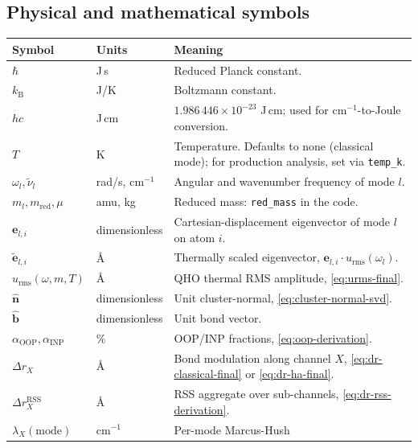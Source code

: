 \documentclass[10pt,a4paper,twoside]{article}
\newcommand{\evec}{\mathbf{e}}
\newcommand{\nhat}{\hat{\mathbf{n}}}
\newcommand{\bhat}{\hat{\mathbf{b}}}
\newcommand{\kB}{k_{\mathrm{B}}}
\newcommand{\urms}{u_{\mathrm{rms}}}
\newcommand{\OOP}{\mathrm{OOP}}
\newcommand{\INP}{\mathrm{INP}}
\newcommand{\fn}[1]{\texttt{#1}}
\newcommand{\cfgkey}[1]{\texttt{#1}}
\begin{document}
\subsection*{Physical and mathematical symbols}

\begin{longtable}{p{} p{} p{}}
\toprule
\textbf{Symbol} & \textbf{Units} & \textbf{Meaning} \\
\midrule
$\hbar$ & J\,s & Reduced Planck constant. \\
$\kB$ & J/K & Boltzmann constant. \\
$hc$ & J\,cm & $1.986\,446 \times 10^{-23}$ J\,cm; used for
                  cm$^{-1}$-to-Joule conversion. \\
$T$ & K & Temperature. Defaults to none (classical mode); for
              production analysis, set via \cfgkey{temp\_k}. \\
$\omega_l, \tilde\nu_l$ & rad/s, cm$^{-1}$ & Angular and wavenumber
                          frequency of mode $l$. \\
$m_l, m_\text{red}, \mu$ & amu, kg & Reduced mass: \fn{red\_mass}
                                       in the code. \\
$\evec_{l,i}$ & dimensionless & Cartesian-displacement eigenvector
                              of mode $l$ on atom $i$. \\
$\widetilde{\evec}_{l,i}$ & \AA{} & Thermally scaled eigenvector,
                                  $\evec_{l,i} \cdot \urms(\omega_l)$. \\
$\urms(\omega, m, T)$ & \AA{} & QHO thermal RMS amplitude,
                                \cref{eq:urms-final}. \\
$\nhat$ & dimensionless & Unit cluster-normal,
                            \cref{eq:cluster-normal-svd}. \\
$\bhat$ & dimensionless & Unit bond vector. \\
$\alpha_{\OOP}, \alpha_{\INP}$ & \% & OOP/INP fractions,
                                       \cref{eq:oop-derivation}. \\
$\Delta r_X$ & \AA{} & Bond modulation along channel $X$,
                       \cref{eq:dr-classical-final}
                       or \cref{eq:dr-ha-final}. \\
$\Delta r_X^\text{RSS}$ & \AA{} & RSS aggregate over sub-channels,
                                    \cref{eq:dr-rss-derivation}. \\
$\lambda_X(\text{mode})$ & cm$^{-1}$ & Per-mode Marcus-Hush

\end{longtable}
\end{document}
